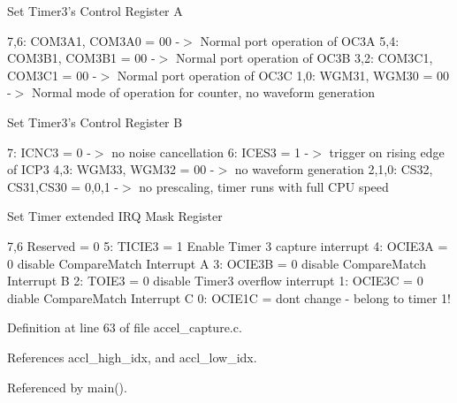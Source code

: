 Set Timer3's Control Register A

7,6: COM3A1, COM3A0 = 00 -$>$ Normal port operation of OC3A 5,4: COM3B1, COM3B1 = 00 -$>$ Normal port operation of OC3B 3,2: COM3C1, COM3C1 = 00 -$>$ Normal port operation of OC3C 1,0: WGM31, WGM30 = 00 -$>$ Normal mode of operation for counter, no waveform generation

Set Timer3's Control Register B

7: ICNC3 = 0 -$>$ no noise cancellation 6: ICES3 = 1 -$>$ trigger on rising edge of ICP3 4,3: WGM33, WGM32 = 00 -$>$ no waveform generation 2,1,0: CS32, CS31,CS30 = 0,0,1 -$>$ no prescaling, timer runs with full CPU speed

Set Timer extended IRQ Mask Register

7,6 Reserved = 0 5: TICIE3 = 1 Enable Timer 3 capture interrupt 4: OCIE3A = 0 disable Compare\-Match Interrupt A 3: OCIE3B = 0 disable Compare\-Match Interrupt B 2: TOIE3 = 0 disable Timer3 overflow interrupt 1: OCIE3C = 0 diable Compare\-Match Interrupt C 0: OCIE1C = dont change - belong to timer 1! 

Definition at line 63 of file accel\_\-capture.c.

References accl\_\-high\_\-idx, and accl\_\-low\_\-idx.

Referenced by main().